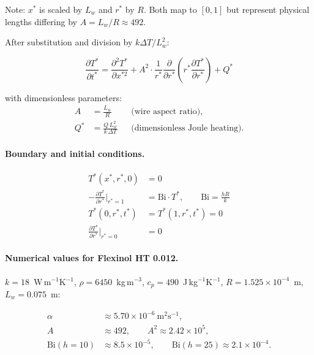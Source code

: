 \documentclass[12pt, a4paper]{article}
\begin{document}
Note: $x^*$ is scaled by $L_w$ and $r^*$ by $R$. Both map to $[0,1]$ but
represent physical lengths differing by $A = L_w/R \approx 492$.

After substitution and division by $k\Delta T/L_w^2$:

\begin{equation}
    \boxed{
    \frac{\partial T^*}{\partial t^*}
    = \frac{\partial^2 T^*}{\partial x^{*2}}
    + A^2 \cdot \frac{1}{r^*}\frac{\partial}{\partial r^*}
      \!\left(r^*\frac{\partial T^*}{\partial r^*}\right)
    + Q^*
    }
    \label{eq:heat2d_nondim}
\end{equation}

with dimensionless parameters:
\begin{align}
    A   &= \frac{L_w}{R}                  && \text{(wire aspect ratio)},
    \label{eq:def_A}\\
    Q^* &= \frac{Q\, L_w^2}{k\,\Delta T} && \text{(dimensionless Joule heating).}
    \label{eq:def_Qstar}
\end{align}

\paragraph{Boundary and initial conditions.}
\begin{align}
    T^*(x^*, r^*, 0) &= 0
    \label{eq:IC_nondim}\\
    -\frac{\partial T^*}{\partial r^*}\bigg|_{r^*=1}
    &= \mathrm{Bi}\cdot T^*, \qquad \mathrm{Bi} = \frac{h R}{k}
    \label{eq:BC_conv_nondim}\\
    T^*(0, r^*, t^*) &= T^*(1, r^*, t^*) = 0
    \label{eq:BC_dir_nondim}\\
    \frac{\partial T^*}{\partial r^*}\bigg|_{r^*=0} &= 0
    \label{eq:BC_sym_nondim}
\end{align}

\paragraph{Numerical values for Flexinol HT 0.012\textquotedbl.}
$k = 18$~W\,m$^{-1}$K$^{-1}$, $\rho = 6450$~kg\,m$^{-3}$,
$c_p = 490$~J\,kg$^{-1}$K$^{-1}$, $R = 1.525\times10^{-4}$~m,
$L_w = 0.075$~m:

\begin{align}
    \alpha &\approx 5.70\times10^{-6}\ \text{m}^2\text{s}^{-1},
    \label{eq:alpha_niti}\\
    A      &\approx 492, \qquad A^2 \approx 2.42\times10^5,
    \label{eq:A_niti}\\
    \mathrm{Bi}(h = 10) &\approx 8.5\times10^{-5}, \qquad
    \mathrm{Bi}(h = 25) \approx 2.1\times10^{-4}.
    \label{eq:Bi_niti}
\end{align}
\end{document}
